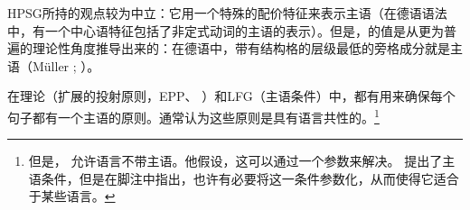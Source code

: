 HPSG\indexhpsgc 所持的观点较为中立：它用一个特殊的配价特征来表示主语（在德语语法中，有一个中心语特征包括了非定式动词的主语的表示）。但是，\subjfc 的值是从更为普遍的理论性角度推导出来的：在德语中，带有结构格的层级最低的旁格成分就是主语（Müller \citeyear[]{Mueller2002b}; \citeyear[]{MuellerLehrbuch1}）。

在\gbc 理论（扩展的投射原则，EPP、 ）和LFG\indexlfg （主语条件）中，都有用来确保每个句子都有一个主语的原则。通常认为这些原则是具有语言共性的。\footnote{%
但是，  \citet[]{Chomsky81a}允许语言不带主语。他假设，这可以通过一个参数来解决。 \citet[]{Bresnan2001a}提出了主语条件，但是在脚注中指出，也许有必要将这一条件参数化，从而使得它适合于某些语言。%
} 
 
